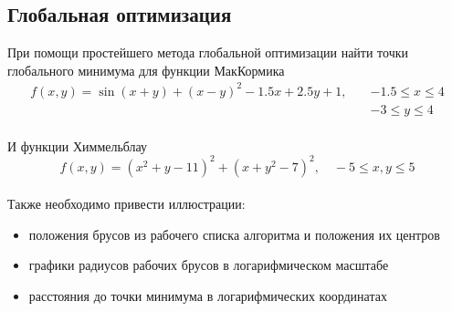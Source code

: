 \subsection{Глобальная оптимизация}
При помощи простейшего метода глобальной оптимизации найти точки глобального минимума для функции МакКормика 
\begin{equation}\label{McCormick}
\begin{split}
    f(x,y)=\sin(x+y)+(x-y)^2-1.5x+2.5y+1, 
    \quad    &-1.5\leq x \leq 4\\
        &-3\leq y \leq 4
\end{split}
\end{equation}
\\
И функции Химмельблау
\begin{equation}\label{Himmelblau}
    f(x, y) = (x^2 + y - 11)^2 + (x + y^2 - 7)^2, \quad -5 \leq x,y \leq 5
\end{equation}
\\
Также необходимо привести иллюстрации:
\begin{itemize}
    \item положения брусов из рабочего списка алгоритма и положения их центров
    \item графики радиусов рабочих брусов в логарифмическом масштабе
    \item расстояния до точки минимума в логарифмических координатах
\end{itemize}

